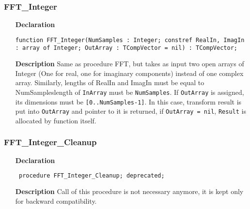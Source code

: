 \documentclass[12pt,a4paper,oneside]{report}
\newcommand{\declarationitem}[1]{\textbf{#1}}
\newcommand{\descriptiontitle}[1]{\textbf{#1}}
\newcommand{\code}[1]{\texttt{#1}}
\begin{document}
\subsubsection{FFT{\_}Integer}
\label{ufft-FFT_Integer}
\begin{itemize}\item[\declarationitem{Declaration}\hfill]
	\begin{flushleft}
		\code{function FFT{\_}Integer(NumSamples               : Integer;
			constref RealIn, ImagIn : array of Integer;
			OutArray          : TCompVector = nil) : TCompVector;
		}
	\end{flushleft}
	\item[\descriptiontitle{Description}]
	Same as procedure FFT, but takes as input two open arrays of Integer (One for real, one for imaginary components) instead of one complex array. Similarly, lengths of RealIn and ImagIn must be equal to NumSampleslength of \code{InArray} must be \code{NumSamples}. 
	If \code{OutArray} is assigned, its dimensions must be \code{[0..NumSamples-1]}. In this case, transform result is put into \code{OutArray} and pointer to it is returned, if \code{OutArray = nil}, \code{Result} is allocated by function itself.
\end{itemize}
\subsubsection{FFT{\_}Integer{\_}Cleanup}
\label{ufft-FFT_Integer_Cleanup}
\begin{itemize}\item[\declarationitem{Declaration}\hfill]
	\begin{flushleft}
		\code{
			procedure FFT{\_}Integer{\_}Cleanup; deprecated;}
	\end{flushleft}
	\item[\descriptiontitle{Description}]
Call of this procedure is not necessary anymore, it is kept only for backward compatibility.
\end{itemize}
\end{document}
